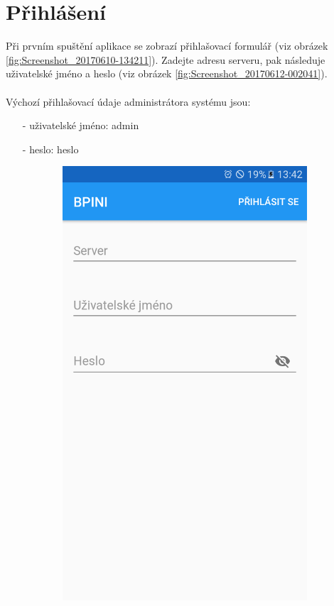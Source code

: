 \documentclass[12pt]{report}
\begin{document}
\section{Přihlášení}	
Při prvním spuštění aplikace se zobrazí přihlašovací formulář (viz obrázek \ref{fig:Screenshot_20170610-134211}).
Zadejte adresu serveru, pak následuje uživatelské jméno a heslo (viz obrázek \ref{fig:Screenshot_20170612-002041}). 
\\\\
Výchozí přihlašovací údaje administrátora systému jsou:
\begin{itemize}[noitemsep]
\item [-] uživatelské jméno: admin
\item [-] heslo: heslo
\end{itemize}
\begin{figure}[H]
	\centering
  \begin{subfigure}[b]{0.3\textwidth}
    \centering
	\includegraphics[width=\textwidth]{../images/client_android/Screenshot_20170610-134211.png}	

\end{subfigure}
\end{figure}
\end{document}
